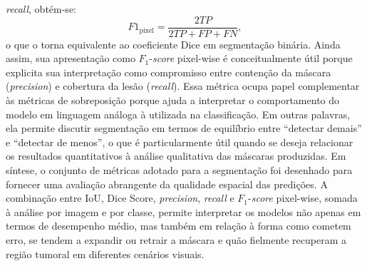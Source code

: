 \documentclass[tcc,capa]{texufpel}
\begin{document}
\textit{recall}, obtém-se: \[ F1_{\text{pixel}} = \frac{2TP}{2TP+FP+FN}, \] o que o torna equivalente ao coeficiente Dice em segmentação binária. Ainda assim, sua apresentação como \(F_1\)-\textit{score} pixel-wise é conceitualmente útil porque explicita sua interpretação como compromisso entre contenção da máscara (\textit{precision}) e cobertura da lesão (\textit{recall}). Essa métrica ocupa papel complementar às métricas de sobreposição porque ajuda a interpretar o comportamento do modelo em linguagem análoga à utilizada na classificação. Em outras palavras, ela permite discutir segmentação em termos de equilíbrio entre “detectar demais” e “detectar de menos”, o que é particularmente útil quando se deseja relacionar os resultados quantitativos à análise qualitativa das máscaras produzidas. Em síntese, o conjunto de métricas adotado para a segmentação foi desenhado para fornecer uma avaliação abrangente da qualidade espacial das predições. A combinação entre IoU, Dice Score, \textit{precision}, \textit{recall} e \(F_1\)-\textit{score} pixel-wise, somada à análise por imagem e por classe, permite interpretar os modelos não apenas em termos de desempenho médio, mas também em relação à forma como cometem erro, se tendem a expandir ou retrair a máscara e quão fielmente recuperam a região tumoral em diferentes cenários visuais.
\end{document}
